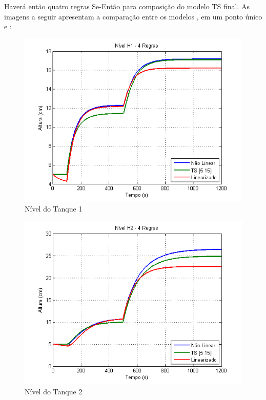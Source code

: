 Haverá então quatro regras Se-Então para composição do modelo TS final. As imagens a seguir apresentam a comparação entre os modelos ,  em um ponto único e :

\begin{figure}[H]
	\centering
	\includegraphics[width=\textwidth]{img/h1_ts2.png}
	\caption{\small Nível do Tanque 1}
	\label{figH1TS2}
\end{figure}

\begin{figure}[H]
	\centering
	\includegraphics[width=\textwidth ]{img/h2_ts2.png}
	\caption{\small Nível do Tanque 2}
	\label{figH2TS2}
\end{figure}


